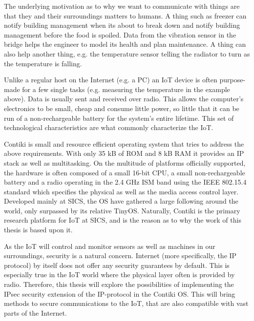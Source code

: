 \documentclass[final,a4paper,twoside,11pt,onecolumn]{report}
\begin{document}
The underlying motivation as to why we want to communicate with things are that they and their surroundings matters to humans. A thing such as freezer can notify building management when its about to break down and notify building management before the food is spoiled. Data from the vibration sensor in the bridge helps the engineer to model its health and plan maintenance. A thing can also help another thing, e.g. the temperature sensor telling the radiator to turn as the temperature is falling.


Unlike a regular host on the Internet (e.g. a PC) an IoT device is often purpose-made for a few single tasks (e.g. measuring the temperature in the example above). Data is usually sent and received over radio. This allows the computer's electronics to be small, cheap and consume little power, so little that it can be run of a non-rechargeable battery for the system's entire lifetime. This set of technological characteristics are what commonly characterize the IoT.


Contiki is small and resource efficient operating system that tries to address the above requirements. With only 35 kB of ROM and 8 kB RAM it provides an IP stack as well as multitasking. On the multitude of platforms officially supported, the hardware is often composed of a small 16-bit CPU, a small non-rechargeable battery and a radio operating in the 2.4 GHz ISM band using the IEEE 802.15.4 standard which specifies the physical as well as the media access control layer. Developed mainly at SICS, the OS have gathered a large following around the world, only surpassed by its relative TinyOS. Naturally, Contiki is the primary research platform for IoT at SICS, and is the reason as to why the work of this thesis is based upon it.

As the IoT will control and monitor sensors as well as machines in our surroundings, security is a natural concern. Internet (more specifically, the IP protocol) by itself does not offer any security guarantees by default. This is especially true in the IoT world where the physical layer often is provided by radio. Therefore, this thesis will explore the possibilities of implementing the IPsec security extension of the IP-protocol in the Contiki OS. This will bring methods to secure communications to the IoT, that are also compatible with vast parts of the Internet.
\end{document}
